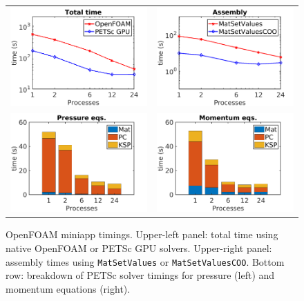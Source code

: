 \documentclass[10pt,journal,compsoc]{IEEEtran}
\begin{document}
\begin{figure}[htbp]
\begin{center}
\begingroup
\setlength{\tabcolsep}{0pt}
\begin{tabular}{c c}
\includegraphics[width=.5\linewidth]{figures/openfoam_total.png} & \includegraphics[width=.5\linewidth]{figures/openfoam_assembly.png}\\
\includegraphics[width=.5\linewidth]{figures/openfoam_P.png}     & \includegraphics[width=.5\linewidth]{figures/openfoam_U.png}
\end{tabular}
\endgroup
\caption{OpenFOAM miniapp timings. Upper-left panel: total time using native OpenFOAM or PETSc GPU solvers. Upper-right panel: assembly times using {\tt MatSetValues} or {\tt MatSetValuesCOO}. Bottom row: breakdown of PETSc solver timings for pressure (left) and momentum equations (right). }
\label{fig:foam_coo}
\end{center}
\end{figure}
\end{document}
